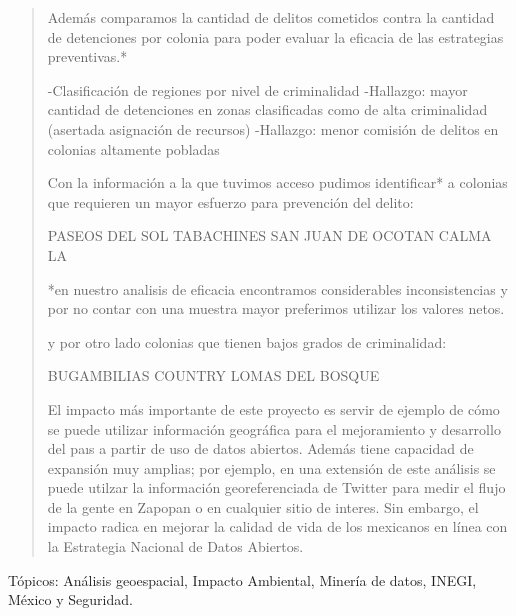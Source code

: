 \begin{quotation}
Además comparamos la cantidad de delitos cometidos contra la cantidad de detenciones por colonia para poder evaluar la eficacia de las estrategias preventivas.*


-Clasificación de regiones por nivel de criminalidad
-Hallazgo: mayor cantidad de detenciones en zonas clasificadas como de alta criminalidad (asertada asignación de recursos)
-Hallazgo: menor comisión de delitos en colonias altamente pobladas

Con la información a la que tuvimos acceso pudimos identificar* a colonias que requieren un mayor esfuerzo para prevención del delito:

PASEOS DEL SOL
TABACHINES
SAN JUAN DE OCOTAN
CALMA LA

*en nuestro analisis de eficacia encontramos considerables inconsistencias y por no contar con una muestra mayor preferimos utilizar los valores netos.

y por otro lado colonias que tienen bajos grados de criminalidad:

BUGAMBILIAS COUNTRY
LOMAS DEL BOSQUE


El impacto más importante de este proyecto es servir de ejemplo de cómo se puede utilizar  información geográfica  para el mejoramiento y desarrollo del paıs a partir de uso de datos abiertos. Además tiene capacidad  de expansión muy amplias; por ejemplo, en una extensión de este análisis se puede utilzar la información georeferenciada de Twitter para medir el flujo de la gente en Zapopan o en cualquier sitio de interes. Sin embargo, el impacto radica en mejorar la calidad de vida de los mexicanos en línea con la Estrategia Nacional de Datos Abiertos.
                                                   
                        




\end{quotation}

\vfill
Tópicos: Análisis geoespacial,  Impacto Ambiental, Minería de datos, INEGI, México y Seguridad.

